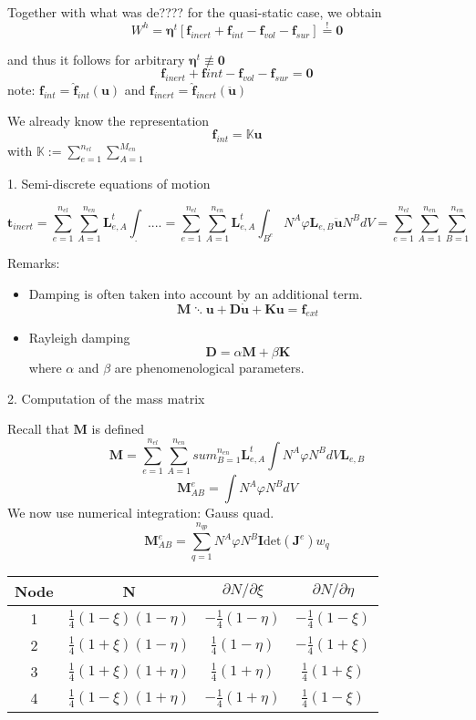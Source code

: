 \documentclass[10pt,a4paper]{article}
\begin{document}
Together with what was de???? for the quasi-static case, we obtain
\[ W^h = \bm\eta^t [ \bm f_{inert} + \bm f_{int} - \bm f_{vol} - \bm f_{sur} ] \overset{!}{=} \bm 0 \]

and thus it follows for arbitrary $\bm\eta^t \not\equiv \bm 0$
\[ \bm f_{inert} + \bm f{int} - \bm f_{vol} - \bm f_{sur} = \bm 0 \]
note: $\bm f_{int} = \bm{\hat{f}}_{int} (\bm u)$ and $\bm f_{inert} = \bm{\hat{f}}_{inert} (\bm{\ddot{u}})$

We already know the representation
\[ \bm f_{int} = \pmb{\mathbb{K}} \bm u \]
with $\pmb{\mathbb{K}} := \sum_{e=1}^{n_{el}} \sum_{A=1}^{M_{en}}$








1. Semi-discrete equations of motion

\[ \bm t_{inert} = \sum_{e=1}^{n_{el}} \sum_{A=1}^{n_{en}} \bm L_{e,A}^t \int_.....
= \sum_{e=1}^{n_{el}} \sum_{A=1}^{n_{en}} \bm L_{e,A}^t \int_{B^e} N^A \varphi \bm L_{e,B} \bm{\ddot{u}} N^B dV
= \sum_{e=1}^{n_{el}} \sum_{A=1}^{n_{en}} \sum_{B=1}^{n_{en}}
\]

{Remarks:} \\
\begin{itemize}
\item Damping is often taken into account by an additional term.
\[ \bm M \bm{\ddots{u}} + \bm D \bm{\dot{u}} + \bm K \bm u = \bm f_{ext} \]
\item Rayleigh damping
\[ \bm D = \alpha \bm M + \beta \bm K \]
where $\alpha$ and $\beta$ are phenomenological parameters.
\end{itemize}

2. Computation of the mass matrix

Recall that $\bm M$ is defined
\[ \bm M = \sum_{e=1}^{n_{el}} \sum_{A=1}^{n_{en}} sum_{B=1}^{n_{en}} \bm L_{e,A}^t \int N^A \varphi N^B dV \bm L_{e,B} \]
\begin{equation}
\bm M_{AB}^e = \int N^A \varphi N^B dV
\label{eq:MassMatEntriesExact}
\end{equation}
We now use numerical integration: Gauss quad.
\begin{equation}
\bm M_{AB}^e = \sum_{q=1}^{n_{qp}} N^A \varphi N^B \bm I \text{det}(\bm J^e) w_q
\label{eq:MassMatEntriesNumerical}
\end{equation}

\begin{tabular}{c || c | c | c}
Node & N & $\partial N / \partial \xi$ & $\partial N / \partial \eta$ \\
\hline
1 & $\frac{1}{4} (1-\xi)(1-\eta)$ & $-\frac{1}{4}(1-\eta)$ & $-\frac{1}{4}(1-\xi)$ \\
2 & $\frac{1}{4} (1+\xi)(1-\eta)$ & $ \frac{1}{4}(1-\eta)$ & $-\frac{1}{4}(1+\xi)$ \\
3 & $\frac{1}{4} (1+\xi)(1+\eta)$ & $ \frac{1}{4}(1+\eta)$ & $ \frac{1}{4}(1+\xi)$ \\
4 & $\frac{1}{4} (1-\xi)(1+\eta)$ & $-\frac{1}{4}(1+\eta)$ & $ \frac{1}{4}(1-\xi)$
\end{tabular}
\end{document}
